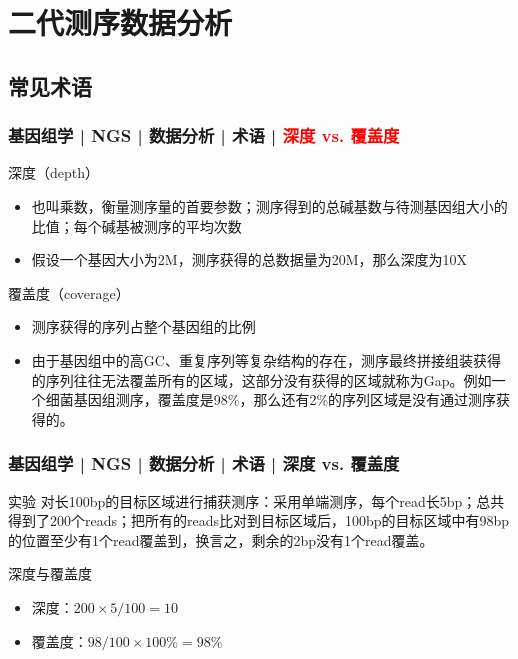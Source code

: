 \section{二代测序数据分析}
\subsection{常见术语}
\begin{frame}
  \frametitle{基因组学 | NGS | 数据分析 | 术语 | \textcolor{red}{深度 vs. 覆盖度}}
  \begin{block}{深度（depth）}
    \begin{itemize}
      \item 也叫乘数，衡量测序量的首要参数；测序得到的总碱基数与待测基因组大小的比值；每个碱基被测序的平均次数
      \item 假设一个基因大小为2M，测序获得的总数据量为20M，那么深度为10X
    \end{itemize}
  \end{block}
  \pause
  \begin{block}{覆盖度（coverage）}
    \begin{itemize}
      \item 测序获得的序列占整个基因组的比例
      \item 由于基因组中的高GC、重复序列等复杂结构的存在，测序最终拼接组装获得的序列往往无法覆盖所有的区域，这部分没有获得的区域就称为Gap。例如一个细菌基因组测序，覆盖度是98\%，那么还有2\%的序列区域是没有通过测序获得的。
    \end{itemize}
  \end{block}
\end{frame}

\begin{frame}
  \frametitle{基因组学 | NGS | 数据分析 | 术语 | 深度 vs. 覆盖度}
  \begin{block}{实验}
对长100bp的目标区域进行捕获测序：采用单端测序，每个read长5bp；总共得到了200个reads；把所有的reads比对到目标区域后，100bp的目标区域中有98bp的位置至少有1个read覆盖到，换言之，剩余的2bp没有1个read覆盖。
  \end{block}
  \pause
  \begin{block}{深度与覆盖度}
    \begin{itemize}
      \item 深度：$200 \times 5 / 100 = 10$
      \item 覆盖度：$98 / 100 \times 100\% = 98\%$
    \end{itemize}
  \end{block}
\end{frame}

